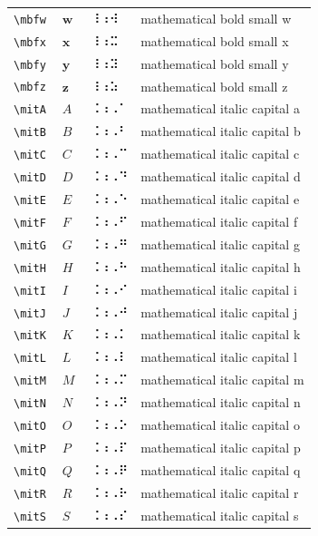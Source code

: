 \documentclass[oneside]{article}
\begin{document}
\begin{longtable}{llll}
\verb|\mbfw| & $\mbfw$ &  ⠸⠰⠺  & {mathematical bold small w} \\[2ex]
\verb|\mbfx| & $\mbfx$ &  ⠸⠰⠭  & {mathematical bold small x} \\[2ex]
\verb|\mbfy| & $\mbfy$ &  ⠸⠰⠽  & {mathematical bold small y} \\[2ex]
\verb|\mbfz| & $\mbfz$ &  ⠸⠰⠵  & {mathematical bold small z} \\[2ex]
\verb|\mitA| & $\mitA$ &  ⠨⠰⠠⠁  & {mathematical italic capital a} \\[2ex]
\verb|\mitB| & $\mitB$ &  ⠨⠰⠠⠃  & {mathematical italic capital b} \\[2ex]
\verb|\mitC| & $\mitC$ &  ⠨⠰⠠⠉  & {mathematical italic capital c} \\[2ex]
\verb|\mitD| & $\mitD$ &  ⠨⠰⠠⠙  & {mathematical italic capital d} \\[2ex]
\verb|\mitE| & $\mitE$ &  ⠨⠰⠠⠑  & {mathematical italic capital e} \\[2ex]
\verb|\mitF| & $\mitF$ &  ⠨⠰⠠⠋  & {mathematical italic capital f} \\[2ex]
\verb|\mitG| & $\mitG$ &  ⠨⠰⠠⠛  & {mathematical italic capital g} \\[2ex]
\verb|\mitH| & $\mitH$ &  ⠨⠰⠠⠓  & {mathematical italic capital h} \\[2ex]
\verb|\mitI| & $\mitI$ &  ⠨⠰⠠⠊  & {mathematical italic capital i} \\[2ex]
\verb|\mitJ| & $\mitJ$ &  ⠨⠰⠠⠚  & {mathematical italic capital j} \\[2ex]
\verb|\mitK| & $\mitK$ &  ⠨⠰⠠⠅  & {mathematical italic capital k} \\[2ex]
\verb|\mitL| & $\mitL$ &  ⠨⠰⠠⠇  & {mathematical italic capital l} \\[2ex]
\verb|\mitM| & $\mitM$ &  ⠨⠰⠠⠍  & {mathematical italic capital m} \\[2ex]
\verb|\mitN| & $\mitN$ &  ⠨⠰⠠⠝  & {mathematical italic capital n} \\[2ex]
\verb|\mitO| & $\mitO$ &  ⠨⠰⠠⠕  & {mathematical italic capital o} \\[2ex]
\verb|\mitP| & $\mitP$ &  ⠨⠰⠠⠏  & {mathematical italic capital p} \\[2ex]
\verb|\mitQ| & $\mitQ$ &  ⠨⠰⠠⠟  & {mathematical italic capital q} \\[2ex]
\verb|\mitR| & $\mitR$ &  ⠨⠰⠠⠗  & {mathematical italic capital r} \\[2ex]
\verb|\mitS| & $\mitS$ &  ⠨⠰⠠⠎  & {mathematical italic capital s} \\[2ex]

\end{longtable}
\end{document}
